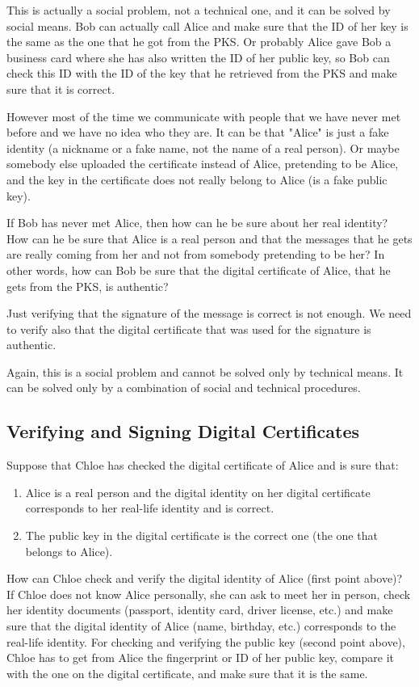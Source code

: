 \documentclass[a4paper]{article}
\begin{document}
This is actually a social problem, not a technical one, and it can be
solved by social means. Bob can actually call Alice and make sure that
the ID of her key is the same as the one that he got from the PKS.  Or
probably Alice gave Bob a business card where she has also written the
ID of her public key, so Bob can check this ID with the ID of the key
that he retrieved from the PKS and make sure that it is correct.

However most of the time we communicate with people that we have never
met before and we have no idea who they are. It can be that "Alice" is
just a fake identity (a nickname or a fake name, not the name of a
real person). Or maybe somebody else uploaded the certificate instead
of Alice, pretending to be Alice, and the key in the certificate does
not really belong to Alice (is a fake public key).

If Bob has never met Alice, then how can he be sure about her real
identity? How can he be sure that Alice is a real person and that the
messages that he gets are really coming from her and not from somebody
pretending to be her? In other words, how can Bob be sure that the
digital certificate of Alice, that he gets from the PKS, is authentic?

Just verifying that the signature of the message is correct is not
enough.  We need to verify also that the digital certificate that was
used for the signature is authentic.

Again, this is a social problem and cannot be solved only by technical
means.  It can be solved only by a combination of social and technical
procedures.

\subsection{Verifying and Signing Digital Certificates}

Suppose that Chloe has checked the digital certificate of Alice and is
sure that:
\begin{enumerate}
  \item Alice is a real person and the digital identity on her digital
    certificate corresponds to her real-life identity and is correct.
  \item The public key in the digital certificate is the correct one
    (the one that belongs to Alice).
\end{enumerate}

How can Chloe check and verify the digital identity of Alice (first
point above)? If Chloe does not know Alice personally, she can ask to
meet her in person, check her identity documents (passport, identity
card, driver license, etc.)  and make sure that the digital identity
of Alice (name, birthday, etc.)  corresponds to the real-life
identity. For checking and verifying the public key (second point
above), Chloe has to get from Alice the fingerprint or ID of her
public key, compare it with the one on the digital certificate, and
make sure that it is the same.
\end{document}
